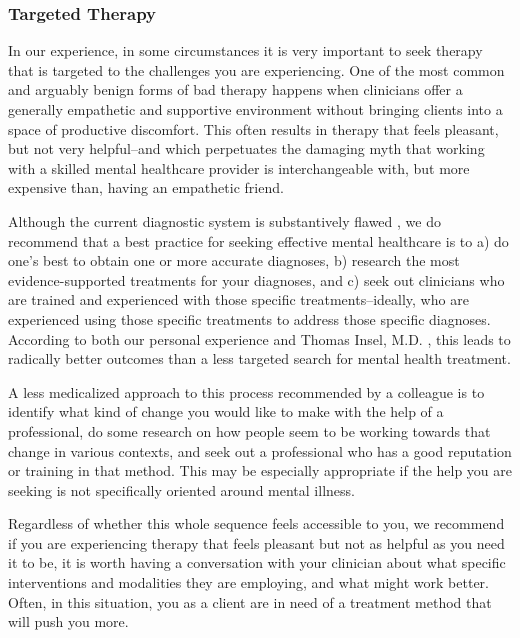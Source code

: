\documentclass[12pt,letterpaper]{book}
\begin{document}
\subsubsection*{Targeted Therapy}
In our experience, in some circumstances it is very important to seek therapy that is targeted to the challenges you are experiencing. One of the most common and arguably benign forms of bad therapy happens when clinicians offer a generally empathetic and supportive environment without bringing clients into a space of productive discomfort. This often results in therapy that feels pleasant, but not very helpful–and which perpetuates the damaging myth that working with a skilled mental healthcare provider is interchangeable with, but more expensive than, having an empathetic friend.

Although the current diagnostic system is substantively flawed \cite{cohen2023need,eaton2023review}, we do recommend that a best practice for seeking effective mental healthcare is to a) do one's best to obtain one or more accurate diagnoses, b) research the most evidence-supported treatments for your diagnoses, and c) seek out clinicians who are trained and experienced with those specific treatments–ideally, who are experienced using those specific treatments to address those specific diagnoses. According to both our personal experience and Thomas Insel, M.D. \cite{eksIncel}, this leads to radically better outcomes than a less targeted search for mental health treatment.

A less medicalized approach to this process recommended by a colleague \cite{sinback} is to identify what kind of change you would like to make with the help of a professional, do some research on how people seem to be working towards that change in various contexts, and seek out a professional who has a good reputation or training in that method. This may be especially appropriate if the help you are seeking is not specifically oriented around mental illness.

Regardless of whether this whole sequence feels accessible to you, we recommend if you are experiencing therapy that feels pleasant but not as helpful as you need it to be, it is worth having a conversation with your clinician about what specific interventions and modalities they are employing, and what might work better. Often, in this situation, you as a client are in need of a treatment method that will push you more.
\end{document}
